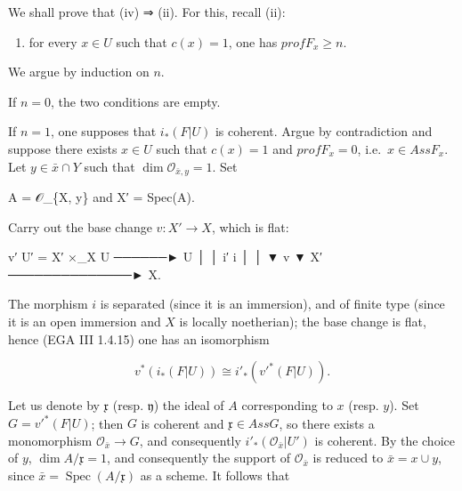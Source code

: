 \documentclass[
]{article}
\newenvironment{Shaded}{}{}
\newcommand{\NormalTok}[1]{#1}
\providecommand{\tightlist}{%
  \setlength{\itemsep}{0pt}\setlength{\parskip}{0pt}}
\begin{document}
We shall prove that (iv) ⇒ (ii). For this, recall (ii):

\begin{enumerate}
\def\labelenumi{(\roman{enumi})}
\setcounter{enumi}{1}
\tightlist
\item
  for every \(x \in U\) such that \(c(x) = 1\), one has
  \(prof F_{x} \geqslant n\).
\end{enumerate}

We argue by induction on \(n\).

If \(n = 0\), the two conditions are empty.

If \(n = 1\), one supposes that \(i_{*}(F|U)\) is coherent. Argue by
contradiction and suppose there exists \(x \in U\) such that
\(c(x) = 1\) and \(prof F_{x} = 0\), i.e.~\(x \in Ass F_{x}\). Let
\(y \in \bar{x} \cap Y\) such that
\(\dim \mathcal{O}_{\bar{x}, y} = 1\). Set

\begin{Shaded}
\begin{Highlighting}[]
\NormalTok{A = 𝒪\_\{X, y\}    and    X′ = Spec(A).}
\end{Highlighting}
\end{Shaded}

Carry out the base change \(v : X' \to X\), which is flat:

\begin{Shaded}
\begin{Highlighting}[]
\NormalTok{            v′}
\NormalTok{   U′ = X′ ×\_X U  ──────►  U}
\NormalTok{        │                   │}
\NormalTok{       i′                   i}
\NormalTok{        │                   │}
\NormalTok{        ▼          v        ▼}
\NormalTok{       X′  ──────────────► X.}
\end{Highlighting}
\end{Shaded}

The morphism \(i\) is separated (since it is an immersion), and of
finite type (since it is an open immersion and \(X\) is locally
noetherian); the base change is flat, hence (EGA III 1.4.15) one has an
isomorphism

\[
v^{*}(i_{*}(F|U)) \cong i'_{*}(v'^{*}(F|U)).
\]

Let us denote by \(\mathfrak{x}\) (resp. \(\mathfrak{y}\)) the ideal of
\(A\) corresponding to \(x\) (resp. \(y\)). Set \(G = v'^{*}(F|U)\);
then \(G\) is coherent and \(\mathfrak{x} \in Ass G\), so there exists a
monomorphism \(\mathcal{O}_{\bar{x}} \to G\), and consequently
\(i'_{*}(\mathcal{O}_{\bar{x}}|U')\) is coherent. By the choice of
\(y\), \(\dim A/\mathfrak{x} = 1\), and consequently the support of
\(\mathcal{O}_{\bar{x}}\) is reduced to \(\bar{x} = {x} \cup {y}\),
since \(\bar{x} = \operatorname{Spec}(A/\mathfrak{x})\) as a scheme. It
follows that
\end{document}
